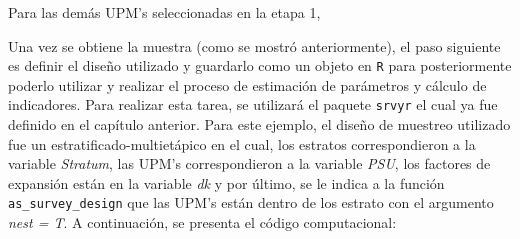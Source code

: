 \documentclass[
  spanish,
  12pt,
]{book}
\newenvironment{Shaded}{\begin{snugshade}}{\end{snugshade}}
\newcommand{\AttributeTok}[1]{\textcolor[rgb]{0.13,0.29,0.53}{#1}}
\newcommand{\ControlFlowTok}[1]{\textcolor[rgb]{0.13,0.29,0.53}{\textbf{#1}}}
\newcommand{\DecValTok}[1]{\textcolor[rgb]{0.00,0.00,0.81}{#1}}
\newcommand{\FunctionTok}[1]{\textcolor[rgb]{0.13,0.29,0.53}{\textbf{#1}}}
\newcommand{\NormalTok}[1]{#1}
\newcommand{\OtherTok}[1]{\textcolor[rgb]{0.56,0.35,0.01}{#1}}
\newcommand{\SpecialCharTok}[1]{\textcolor[rgb]{0.81,0.36,0.00}{\textbf{#1}}}
\newcommand{\StringTok}[1]{\textcolor[rgb]{0.31,0.60,0.02}{#1}}
\begin{document}
Para las demás UPM's seleccionadas en la etapa 1,

\begin{Shaded}
\end{Shaded}

Una vez se obtiene la muestra (como se mostró anteriormente), el paso siguiente es definir el diseño utilizado y guardarlo como un objeto en \texttt{R} para posteriormente poderlo utilizar y realizar el proceso de estimación de parámetros y cálculo de indicadores. Para realizar esta tarea, se utilizará el paquete \texttt{srvyr} el cual ya fue definido en el capítulo anterior. Para este ejemplo, el diseño de muestreo utilizado fue un estratificado-multietápico en el cual, los estratos correspondieron a la variable \emph{Stratum}, las UPM's correspondieron a la variable \emph{PSU}, los factores de expansión están en la variable \emph{dk} y por último, se le indica a la función \texttt{as\_survey\_design} que las UPM's están dentro de los estrato con el argumento \emph{nest = T}. A continuación, se presenta el código computacional:
\end{document}
